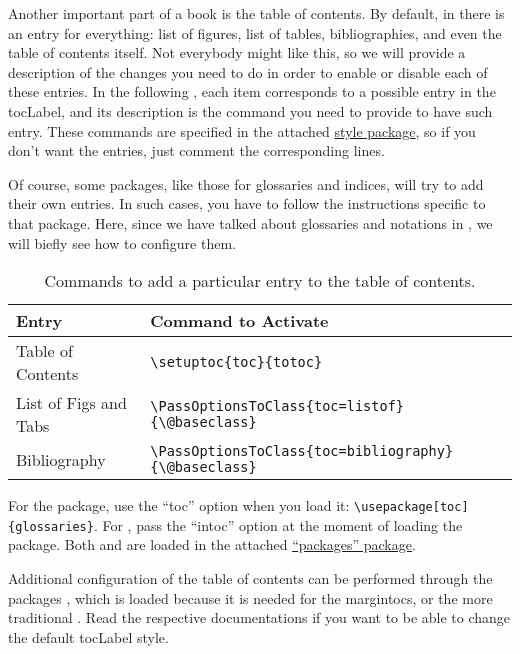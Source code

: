Another important part of a book is the table of contents. By default, 
in  there is an entry for everything: list of figures, 
list of tables, bibliographies, and even the table of contents itself. 
Not everybody might like this, so we will provide a description of the 
changes you need to do in order to enable or disable each of these 
entries. In the following , each item corresponds to 
a possible entry in the \acrshort{tocLabel}, and its description is the 
command you need to provide to have such entry. These commands are 
specified in the attached \href{style/style.sty}{style 
package}, so if you don't want the entries, just comment the 
corresponding lines.

Of course, some packages, like those for glossaries and indices, will 
try to add their own entries. In such cases, you have to follow the 
instructions specific to that package. Here, since we have talked about 
glossaries and notations in , we will biefly see how 
to configure them.

\begin{table}
\footnotesize
\caption{Commands to add a particular entry to the table of contents.}
\begin{tabular}{ l l }
	\toprule
	Entry & Command to Activate \\
	\midrule
	Table of Contents & \lstinline|\setuptoc{toc}{totoc}| \\
	List of Figs and Tabs & \lstinline|\PassOptionsToClass{toc=listof}{\@baseclass}| \\
	Bibliography & \lstinline|\PassOptionsToClass{toc=bibliography}{\@baseclass}| \\
	\bottomrule
\end{tabular}
\end{table}

For the  package, use the \enquote{toc} option when 
you load it: \lstinline|\usepackage[toc]{glossaries}|. For 
, pass the \enquote{intoc} option at the moment of 
loading the package. Both  and  are 
loaded in the attached \href{style/packages.sty}{\enquote{packages} 
package}.

Additional configuration of the table of contents can be performed 
through the packages , which is loaded because it is 
needed for the margintocs, or the more traditional . 
Read the respective documentations if you want to be able to change the 
default \acrshort{tocLabel} style.

